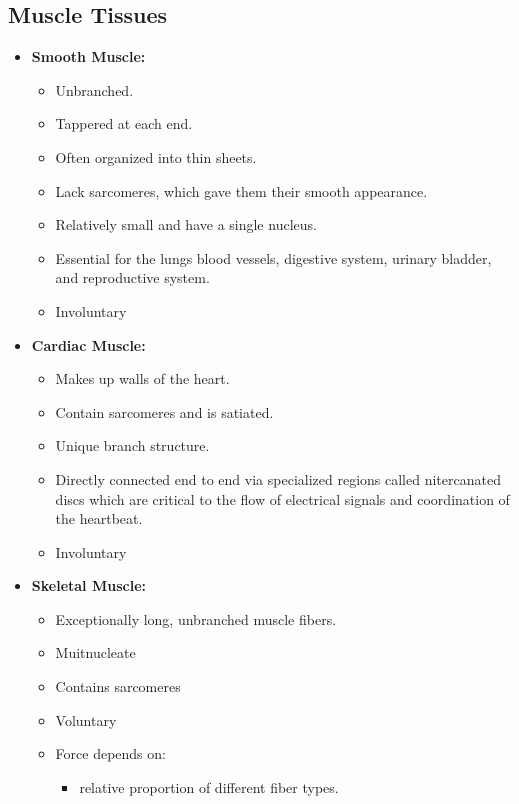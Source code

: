 \documentclass[12pt,a4paper]{article}
\begin{document}
\subsection{Muscle Tissues}
\begin{itemize}
    \item \textbf{Smooth Muscle:}
        \begin{itemize}
            \item Unbranched.
            \item Tappered at each end.
            \item Often organized into thin sheets.
            \item Lack sarcomeres, which gave them their smooth appearance.
            \item Relatively small and have a single nucleus.
            \item Essential for the lungs blood vessels, digestive system, urinary bladder, and reproductive system.
            \item Involuntary
        \end{itemize}
    \item \textbf{Cardiac Muscle:}
        \begin{itemize}
            \item Makes up walls of the heart.
            \item Contain sarcomeres and is satiated. 
            \item Unique branch structure.
            \item Directly connected end to end via specialized regions called nitercanated discs which are critical to the flow of electrical signals and coordination of the heartbeat.
            \item Involuntary
        \end{itemize}        
        \item \textbf{Skeletal Muscle:}
            \begin{itemize}
                \item Exceptionally long, unbranched muscle fibers.
                \item Muitnucleate
                \item Contains sarcomeres
                \item Voluntary
                \item Force depends on:
                    \begin{itemize}
                        \item relative proportion of different fiber types.

\end{itemize}
\end{itemize}
\end{itemize}
\end{document}
